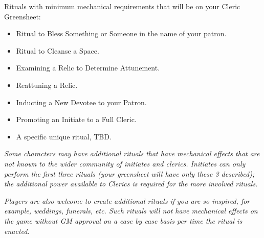 \documentclass[blue]{GL2020}
\begin{document}
Rituals with minimum mechanical requirements that will be on your Cleric Greensheet:
\begin{itemize}
  \item Ritual to Bless Something or Someone in the name of your patron.
  \item Ritual to Cleanse a Space.
  \item Examining a Relic to Determine Attunement.
  \item Reattuning a Relic.
  \item Inducting a New Devotee to your Patron.
  \item Promoting an Initiate to a Full Cleric.
  \item A \pShippie{} specific unique ritual, TBD.
\end{itemize}

\emph{Some characters may have additional rituals that have mechanical effects that are not known to the wider community of initiates and clerics. Initiates can only perform the first three rituals (your greensheet will have only these 3 described); the additional power available to Clerics is required for the more involved rituals.}

\emph{Players are also welcome to create additional rituals if you are so inspired, for example, weddings, funerals, etc. Such rituals will not have mechanical effects on the game without GM approval on a case by case basis per time the ritual is enacted.}
\end{document}
